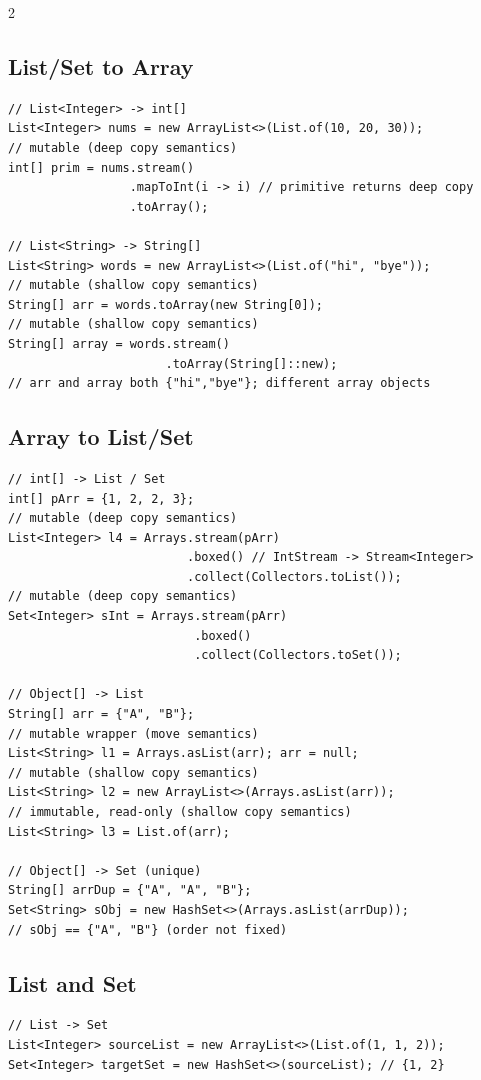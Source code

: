 \documentclass{article}
\begin{document}
\begin{multicols}{2}
\subsection{List/Set to Array}
\begin{lstlisting}
// List<Integer> -> int[]
List<Integer> nums = new ArrayList<>(List.of(10, 20, 30));
// mutable (deep copy semantics)
int[] prim = nums.stream()
                 .mapToInt(i -> i) // primitive returns deep copy
                 .toArray();

// List<String> -> String[]
List<String> words = new ArrayList<>(List.of("hi", "bye"));
// mutable (shallow copy semantics)
String[] arr = words.toArray(new String[0]);
// mutable (shallow copy semantics)
String[] array = words.stream()
                      .toArray(String[]::new);
// arr and array both {"hi","bye"}; different array objects
\end{lstlisting}

\subsection{Array to List/Set}
\begin{lstlisting}
// int[] -> List / Set
int[] pArr = {1, 2, 2, 3};
// mutable (deep copy semantics)
List<Integer> l4 = Arrays.stream(pArr)
                         .boxed() // IntStream -> Stream<Integer>
                         .collect(Collectors.toList());
// mutable (deep copy semantics)
Set<Integer> sInt = Arrays.stream(pArr)
                          .boxed()
                          .collect(Collectors.toSet());

// Object[] -> List
String[] arr = {"A", "B"};
// mutable wrapper (move semantics)
List<String> l1 = Arrays.asList(arr); arr = null;
// mutable (shallow copy semantics)
List<String> l2 = new ArrayList<>(Arrays.asList(arr));
// immutable, read-only (shallow copy semantics)
List<String> l3 = List.of(arr);

// Object[] -> Set (unique)
String[] arrDup = {"A", "A", "B"};
Set<String> sObj = new HashSet<>(Arrays.asList(arrDup));
// sObj == {"A", "B"} (order not fixed)
\end{lstlisting}

\subsection{List and Set}
\begin{lstlisting}
// List -> Set
List<Integer> sourceList = new ArrayList<>(List.of(1, 1, 2));
Set<Integer> targetSet = new HashSet<>(sourceList); // {1, 2}


\end{lstlisting}
\end{multicols}
\end{document}
